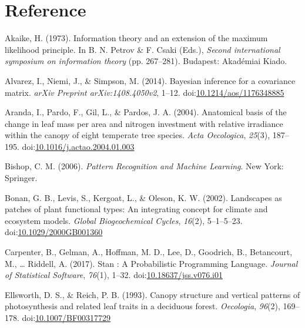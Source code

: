 \documentclass[12pt,]{article}
\let\oldsubparagraph\subparagraph
\renewcommand{\subparagraph}[1]{\oldsubparagraph{#1}\mbox{}}
\theoremstyle{definition}
\theoremstyle{definition}
\theoremstyle{definition}
\theoremstyle{remark}
\begin{document}
\hypertarget{section-7}{%
\subparagraph{}\label{section-7}}

\hypertarget{reference}{%
\section*{Reference}\label{reference}}

\hypertarget{refs}{}
\leavevmode\hypertarget{ref-Akaike1973}{}%
Akaike, H. (1973). Information theory and an extension of the maximum
likelihood principle. In B. N. Petrov \& F. Csaki (Eds.), \emph{Second
international symposium on information theory} (pp. 267--281). Budapest:
Akadémiai Kiado.

\leavevmode\hypertarget{ref-Alvarez2014}{}%
Alvarez, I., Niemi, J., \& Simpson, M. (2014). Bayesian inference for a
covariance matrix. \emph{arXiv Preprint arXiv:1408.4050v2}, 1--12.
doi:\href{https://doi.org/10.1214/aos/1176348885}{10.1214/aos/1176348885}

\leavevmode\hypertarget{ref-Aranda2004}{}%
Aranda, I., Pardo, F., Gil, L., \& Pardos, J. A. (2004). Anatomical
basis of the change in leaf mass per area and nitrogen investment with
relative irradiance within the canopy of eight temperate tree species.
\emph{Acta Oecologica}, \emph{25}(3), 187--195.
doi:\href{https://doi.org/10.1016/j.actao.2004.01.003}{10.1016/j.actao.2004.01.003}

\leavevmode\hypertarget{ref-Bishop2006}{}%
Bishop, C. M. (2006). \emph{Pattern Recognition and Machine Learning}.
New York: Springer.

\leavevmode\hypertarget{ref-Bonan2002}{}%
Bonan, G. B., Levis, S., Kergoat, L., \& Oleson, K. W. (2002).
Landscapes as patches of plant functional types: An integrating concept
for climate and ecosystem models. \emph{Global Biogeochemical Cycles},
\emph{16}(2), 5--1--5--23.
doi:\href{https://doi.org/10.1029/2000GB001360}{10.1029/2000GB001360}

\leavevmode\hypertarget{ref-Carpenter2017}{}%
Carpenter, B., Gelman, A., Hoffman, M. D., Lee, D., Goodrich, B.,
Betancourt, M., \ldots{} Riddell, A. (2017). Stan : A Probabilistic
Programming Language. \emph{Journal of Statistical Software},
\emph{76}(1), 1--32.
doi:\href{https://doi.org/10.18637/jss.v076.i01}{10.18637/jss.v076.i01}

\leavevmode\hypertarget{ref-Ellsworth1993}{}%
Ellsworth, D. S., \& Reich, P. B. (1993). Canopy structure and vertical
patterns of photosynthesis and related leaf traits in a deciduous
forest. \emph{Oecologia}, \emph{96}(2), 169--178.
doi:\href{https://doi.org/10.1007/BF00317729}{10.1007/BF00317729}
\end{document}
